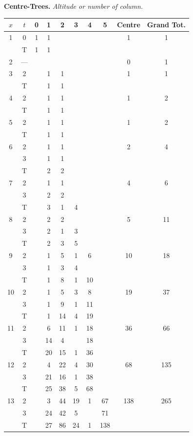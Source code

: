 \documentclass[11pt,a4paper]{book}
\begin{document}
\begin{small}
\noindent\textbf{Centre-Trees.} \textit{Altitude or number of column.}
\begin{center}
\begin{tabular}{|c|c|cccccc|c|c|}
\hline
$x$ & $t$ & 0 & 1 & 2 & 3 & 4 & 5 & Centre & Grand Tot. \\
\hline
1 & 0 & 1 & 1 & & & & & 1 & 1 \\
  & T & 1 & 1 & & & & & & \\
\hline
2 & --- & & & & & & & 0 & 1 \\
\hline
3 & 2 & & 1 & 1 & & & & 1 & 1 \\
  & T & & 1 & 1 & & & & & \\
\hline
4 & 2 & & 1 & 1 & & & & 1 & 2 \\
  & T & & 1 & 1 & & & & & \\
\hline
5 & 2 & & 1 & 1 & & & & 1 & 2 \\
  & T & & 1 & 1 & & & & & \\
\hline
6 & 2 & & 1 & 1 & & & & 2 & 4 \\
  & 3 & & 1 & 1 & & & & & \\
  & T & & 2 & 2 & & & & & \\
\hline
7 & 2 & & 1 & 1 & & & & 4 & 6 \\
  & 3 & & 2 & 2 & & & & & \\
  & T & & 3 & 1 & 4 & & & & \\
\hline
8 & 2 & & 2 & 2 & & & & 5 & 11 \\
  & 3 & & 2 & 1 & 3 & & & & \\
  & T & & 2 & 3 & 5 & & & & \\
\hline
9 & 2 & & 1 & 5 & 1 & 6 & & 10 & 18 \\
  & 3 & & 1 & 3 & 4 & & & & \\
  & T & & 1 & 8 & 1 & 10 & & & \\
\hline
10 & 2 & & 1 & 5 & 3 & 8 & & 19 & 37 \\
   & 3 & & 1 & 9 & 1 & 11 & & & \\
   & T & & 1 & 14 & 4 & 19 & & & \\
\hline
11 & 2 & & 6 & 11 & 1 & 18 & & 36 & 66 \\
   & 3 & & 14 & 4 & & 18 & & & \\
   & T & & 20 & 15 & 1 & 36 & & & \\
\hline
12 & 2 & & 4 & 22 & 4 & 30 & & 68 & 135 \\
   & 3 & & 21 & 16 & 1 & 38 & & & \\
   & T & & 25 & 38 & 5 & 68 & & & \\
\hline
13 & 2 & & 3 & 44 & 19 & 1 & 67 & 138 & 265 \\
   & 3 & & 24 & 42 & 5 & & 71 & & \\
   & T & & 27 & 86 & 24 & 1 & 138 & & \\
\hline
\end{tabular}
\end{center}


\end{small}
\end{document}
